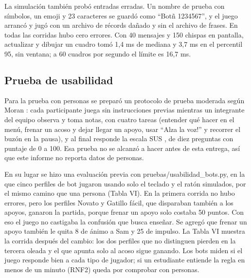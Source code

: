 \documentclass[conference]{IEEEtran}
\begin{document}
La simulación también probó entradas erradas. Un nombre de prueba con símbolos, un emoji y 23 caracteres se guardó como ``Botñ 1234567'', y el juego arrancó y jugó con un archivo de récords dañado y sin el archivo de frases. En todas las corridas hubo cero errores. Con 40 mensajes y 150 chispas en pantalla, actualizar y dibujar un cuadro tomó 1,4 ms de mediana y 3,7 ms en el percentil 95, sin ventana; a 60 cuadros por segundo el límite es 16,7 ms.

\subsection{Prueba de usabilidad}

Para la prueba con personas se preparó un protocolo de prueba moderada según Moran \cite{ref12}: cada participante juega sin instrucciones previas mientras un integrante del equipo observa y toma notas, con cuatro tareas (entender qué hacer en el menú, frenar un acoso y dejar llegar un apoyo, usar ``\textexclamdown{}Alza la voz!'' y recorrer el buzón en la pausa), y al final responde la escala SUS \cite{ref13}, de diez preguntas con puntaje de 0 a 100. Esa prueba no se alcanzó a hacer antes de esta entrega, así que este informe no reporta datos de personas.

En su lugar se hizo una evaluación previa con pruebas/usabilidad\_bots.py, en la que cinco perfiles de bot jugaron usando solo el teclado y el ratón simulados, por el mismo camino que una persona (Tabla VI). En la primera corrida no hubo errores, pero los perfiles Novato y Gatillo fácil, que disparaban también a los apoyos, ganaron la partida, porque frenar un apoyo solo costaba 50 puntos. Con eso el juego no castigaba la confusión que busca enseñar. Se agregó que frenar un apoyo también le quita 8 de ánimo a Sam y 25 de impulso. La Tabla VI muestra la corrida después del cambio: los dos perfiles que no distinguen pierden en la tercera oleada y el que apunta solo al acoso sigue ganando. Los bots miden si el juego responde bien a cada tipo de jugador; si un estudiante entiende la regla en menos de un minuto (RNF2) queda por comprobar con personas.
\end{document}

